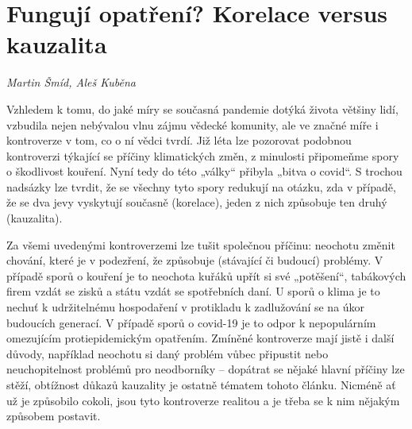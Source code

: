 
\chapter{Fungují opatření? Korelace versus kauzalita} \label{Co_na_cem_zavisi}

\textit{Martin Šmíd, Aleš Kuběna}
\vspace{15mm}

Vzhledem k tomu, do jaké míry se současná pandemie dotýká života většiny lidí, vzbudila nejen nebývalou vlnu zájmu vědecké komunity, ale ve značné míře i kontroverze v tom, co o ní vědci tvrdí. Již léta lze pozorovat podobnou kontroverzi týkající se příčiny klimatických změn, z minulosti připomeňme spory o škodlivost kouření. Nyní tedy do této „války“ přibyla „bitva o covid“. S trochou nadsázky lze tvrdit, že se všechny tyto spory redukují na otázku, zda v případě, že se dva jevy vyskytují současně (korelace), jeden z nich způsobuje ten druhý (kauzalita).

Za všemi uvedenými kontroverzemi lze tušit společnou příčinu: neochotu změnit chování, které je v podezření, že způsobuje (stávající či budoucí) problémy. V případě sporů o kouření je to neochota kuřáků upřít si své „potěšení“, tabákových firem vzdát se zisků a státu vzdát se spotřebních daní. U sporů o klima je to nechuť k udržitelnému hospodaření v protikladu k zadlužování se na úkor budoucích generací. V případě sporů o covid-19 je to odpor k nepopulárním omezujícím protiepidemickým
opatřením. Zmíněné kontroverze mají jistě i další důvody, například neochotu si daný problém vůbec připustit nebo neuchopitelnost problémů pro neodborníky -- dopátrat se nějaké hlavní příčiny lze stěží, obtížnost důkazů kauzality je ostatně tématem tohoto článku. Nicméně ať už je způsobilo cokoli, jsou tyto kontroverze realitou a je třeba se k nim nějakým způsobem postavit.

